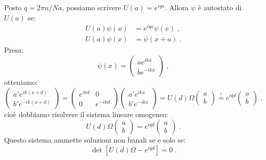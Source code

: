 \documentclass[10pt,a4paper]{report}
\theoremstyle{definition}
\numberwithin{equation}{section}
\begin{document}
Posto $q=2\pi n/Na$, possiamo scrivere $U(a)=e^{iqa}$. Allora $\psi$ è autostato di $U(a)$ se:
\begin{align*}
U(a)\psi(x)&=e^{iqa}\psi(x)\;, \\
U(a)\psi(x)&=\psi(x+a)\;.
\end{align*}
Presa:
\begin{equation}
\psi(x)=\left(
\begin{matrix}
ae^{ikx} \\
be^{-ikx}
\end{matrix}\right)\;,
\end{equation}
otteniamo:
\begin{equation*}
\left(\begin{matrix}
a'e^{ik(x+d)} \\
b'e^{-ik(x+d)}
\end{matrix}\right)=\left(\begin{matrix}
e^{ikd} & 0 \\
0 & e^{-ikd}
\end{matrix}\right)\left(\begin{matrix}
a'e^{ikx} \\
b'e^{-ikx}
\end{matrix}\right)=U(d)\Omega\left(
\begin{matrix}
a \\
b
\end{matrix}\right)\stackrel{!}{=}e^{iqd}\left(
\begin{matrix}
a \\
b
\end{matrix}\right)\;,
\end{equation*}
cioè dobbiamo risolvere il sistema lineare omogeneo:
\begin{equation}
U(d)\Omega\left(\begin{matrix}
a \\
b
\end{matrix}\right)=e^{iqd}\left(\begin{matrix}
a \\
b
\end{matrix}\right)\;.
\end{equation}
Questo sistema ammette soluzioni non banali se e solo se:
\begin{equation}
\det\left[U(d)\Omega-e^{iqd}\right]=0\;.
\end{equation}
\end{document}
